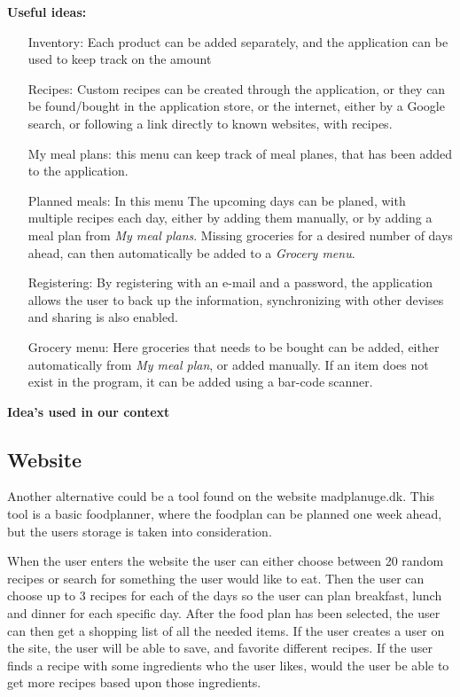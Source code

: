 \textbf{Useful ideas:}
\begin{itemize}
  \item[Inventory:] Each product can be added separately, and the application can be used to keep track on the amount
  \item[Recipes:] Custom recipes can be created through the application, or they can be found/bought in the application store, or the internet, either by a Google search, or following a link directly to known websites, with recipes.
  \item[My meal plans:] this menu can keep track of meal planes, that has been added to the application.
  \item[Planned meals:] In this menu The upcoming days can be planed, with multiple recipes each day, either by adding them manually, or by adding a meal plan from \textit{My meal plans}. Missing groceries for a desired  number of days ahead, can then automatically be added to a \textit{Grocery menu}.
  \item[Registering:] By registering with an e-mail and a password, the application allows the user to back up the information, synchronizing with other devises and sharing is also enabled.
  \item[Grocery menu:] Here groceries that needs to be bought can be added, either automatically from \textit{My meal plan}, or added manually. If an item does not exist in the program, it can be added using a bar-code scanner.
\end{itemize}

\textbf{Idea's used in our context}

\subsection{Website}
Another alternative could be a tool found on the website madplanuge.dk\cite{madSpild_madPlanUge}. This tool is a basic foodplanner, where the foodplan can be planned one week ahead, but the users storage is taken into consideration.

When the user enters the website the user can either choose between 20 random recipes or search for something the user would like to eat.
Then the user can choose up to 3 recipes for each of the days so the user can plan breakfast, lunch and dinner for each specific day.
After the food plan has been selected, the user can then get a shopping list of all the needed items.
If the user creates a user on the site, the user will be able to save, and favorite different recipes.
If the user finds a recipe with some ingredients who the user likes, would the user be able to get more recipes based upon those ingredients.

